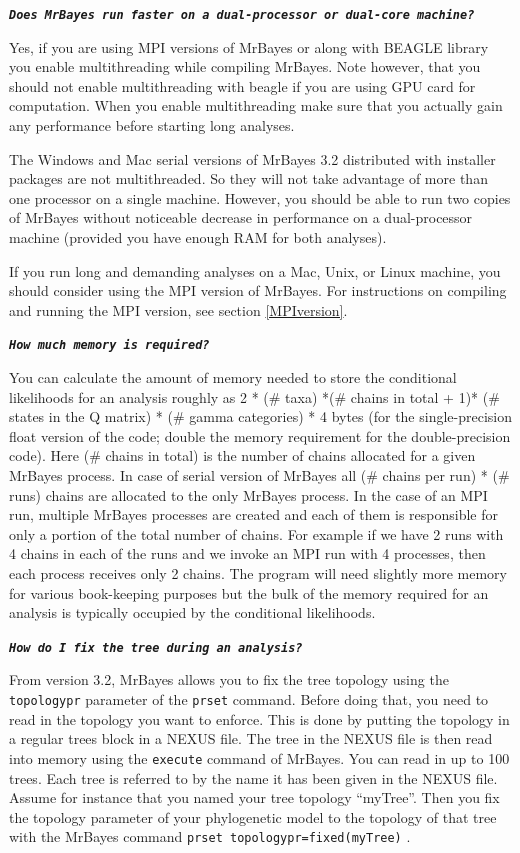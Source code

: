 \documentclass[12pt]{book}
\newcommand{\ttt}[1]{\texttt{#1} }
\newcommand{\tb}[1]{\ttt{\textbf{#1}} }
\begin{document}
\tb{\it{Does MrBayes run faster on a dual-processor or dual-core machine?}}

Yes, if you are using MPI versions of MrBayes or along with BEAGLE library you enable
multithreading while compiling MrBayes. Note however, that you should not enable multithreading
with beagle if you are using GPU card for computation. When you enable multithreading make sure
that you actually gain any performance before starting long analyses.

The Windows and Mac serial versions of MrBayes 3.2 distributed with installer packages are not
multithreaded. So they will not take advantage of more than one processor on a single machine.
However, you should be able to run two copies of MrBayes without noticeable decrease in performance
on a dual-processor machine (provided you have enough RAM for both analyses).

If you run long and demanding analyses on a Mac, Unix, or Linux machine, you should consider using
the MPI version of MrBayes. For instructions on compiling and running the MPI version, see section
\ref{MPIversion}.

\tb{\it{How much memory is required?}}

You can calculate the amount of memory needed to store the conditional likelihoods for an analysis
roughly as 2 * (\# taxa) *(\# chains in total + 1)* (\# states in the Q matrix) * (\# gamma
categories) * 4 bytes (for the single-precision float version of the code; double the memory
requirement for the double-precision code). Here (\# chains in total) is the number of chains
allocated for a given MrBayes process. In case of serial version of MrBayes all (\# chains per run)
* (\# runs) chains are allocated to the only MrBayes process. In the case of an MPI run, multiple
MrBayes processes are created and each of them is responsible for only a portion of the total
number of chains. For example if we have 2 runs with 4 chains in each of the runs and we invoke an
MPI run with 4 processes, then each process receives only 2 chains.  The program will need slightly
more memory for various book-keeping purposes but the bulk of the memory required for an analysis
is typically occupied by the conditional likelihoods.

\tb{\it{How do I fix the tree during an analysis?}}

From version 3.2, MrBayes allows you to fix the tree topology using the \ttt{topologypr}
parameter of the \ttt{prset} command. Before doing that, you need to read in the topology you
want to enforce. This is done by putting the topology in a regular trees block in a NEXUS file. The
tree in the NEXUS file is then read into memory using the \ttt{execute} command of MrBayes. You
can read in up to 100 trees. Each tree is referred to by the name it has been given in the NEXUS
file. Assume for instance that you named your tree topology ``myTree''. Then you fix the topology
parameter of your phylogenetic model to the topology of that tree with the MrBayes command
\ttt{prset topologypr=fixed(myTree)}.
\end{document}
